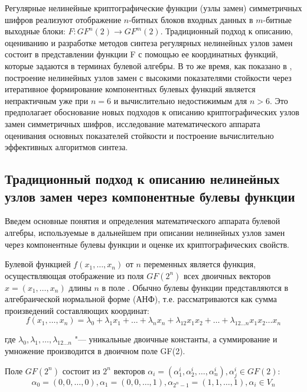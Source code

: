 Регулярные нелинейные криптографические функции (узлы замен) симметричных шифров
реализуют отображение $n$-битных блоков входных данных в $m$-битные выходные
блоки: $F: GF^n(2) \rightarrow GF^m(2)$. Традиционный подход к описанию,
оцениванию и разработке методов синтеза регулярных нелинейных узлов замен
состоит в представлении функции F с помощью ее координатных функций, которые
задаются в терминах булевой алгебры. В то же время, как показано в
\cite{Connor,Soroka}, построение нелинейных узлов замен с высокими показателями
стойкости через итеративное формирование компонентных булевых функций является
непрактичным уже при $n=6$ и вычислительно недостижимым для $n>6$. Это
предполагает обоснование новых подходов к описанию криптографических узлов замен
симметричных шифров, исследование математического аппарата оценивания основных
показателей стойкости и построение вычислительно эффективных алгоритмов синтеза.

\subsection{Традиционный подход к описанию нелинейных узлов замен через
компонентные булевы функции}

Введем основные понятия и определения математического аппарата булевой алгебры,
используемые в дальнейшем при описании нелинейных узлов замен через компонентные
булевы функции и оценке их криптографических свойств.

Булевой функцией $f(x_1, \ldots , x_n)$ от $n$ переменных является функция,
осуществляющая отображение из поля $GF(2^n)$ всех двоичных векторов $x=(x_1, \ldots
,x_n)$ длины $n$ в поле \cite{wiki_boolean_function}. Обычно булевы функции
представляются в алгебраической нормальной форме (АНФ), т.е.  рассматриваются
как сумма произведений составляющих координат:
\begin{equation}f(x_1, \ldots , x_n) = \lambda_0 + \lambda_1 x_1 + \ldots + \lambda_n x_n + \lambda_{12} x_1 x_2 + \ldots + \lambda_{12 \ldots n} x_1 x_2 \ldots x_n\end{equation}

где $\lambda_0, \lambda_1, \ldots, \lambda_{12 \ldots n}$ "--- уникальные
двоичные константы, а суммирование и умножение производится в двоичном поле
GF(2).

Поле $GF(2^n)$ состоит из $2^n$ векторов $\alpha_i = (\alpha^i_1, \alpha^i_2,
\ldots, \alpha^i_n), \alpha^i_j \in GF(2)$:
\begin{equation}\alpha_0 = (0, 0, \ldots, 0), \alpha_1 = (0, 0, \ldots, 1),
\alpha_{2^n - 1} = (1, 1, \ldots, 1), \alpha_i \in V_n\end{equation}

